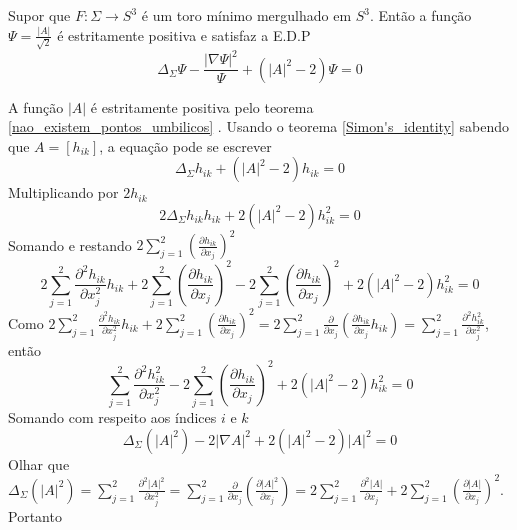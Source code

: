 \begin{proposicao}\label{edp_principal}
	Supor que $F: \Sigma \rightarrow S^3$ é um toro mínimo mergulhado em $S^3$. Então a função $\Psi = \frac{|A|}{\sqrt{2}}$ é estritamente positiva e satisfaz a E.D.P
	\begin{equation*}
		\Delta_\Sigma \Psi - \frac{|\nabla \Psi|^2}{\Psi} + (|A|^2 - 2) \Psi = 0
	\end{equation*}
\end{proposicao}

\begin{demonstracao}
	A função $|A|$ é estritamente positiva pelo teorema \ref{nao_existem_pontos_umbilicos} . Usando o  teorema \ref{Simon's_identity} sabendo que $A = [h_{ik}]$, a equação pode se escrever
	\begin{equation*}
		\Delta_{\Sigma} h_{ik} + (|A|^2 - 2)h_{ik} = 0
	\end{equation*}	
	Multiplicando por $2 h_{ik}$
	\begin{equation*}
		2 \Delta_{\Sigma} h_{ik} h_{ik} + 2 (|A|^2 - 2)h_{ik}^2 = 0
	\end{equation*}	
	Somando e restando $ 2 \sum_{j=1}^2 \left( \frac{\partial h_{ik}}{\partial x_j} \right)^2 $
	\begin{equation*}
		2 \sum_{j=1}^2 \frac{\partial^2 h_{ik}}{\partial x_j^2} h_{ik} + 2 \sum_{j=1}^2 \left( \frac{\partial h_{ik}}{\partial x_j} \right)^2 - 2 \sum_{j=1}^2 \left( \frac{\partial h_{ik}}{\partial x_j} \right)^2 + 2 (|A|^2 - 2)h_{ik}^2 = 0
	\end{equation*}	
	Como $ 2 \sum_{j=1}^2 \frac{\partial^2 h_{ik}}{\partial x_j^2} h_{ik} + 2 \sum_{j=1}^2 \left( \frac{\partial h_{ik}}{\partial x_j} \right)^2 = 2 \sum_{j=1}^2 \frac{\partial }{\partial x_j} \left( \frac{\partial h_{ik}}{\partial x_j} h_{ik} \right) = \sum_{j=1}^2 \frac{\partial^2 h_{ik}^2}{\partial x_j^2} $, então
	\begin{equation*}
		\sum_{j=1}^2 \frac{\partial^2 h_{ik}^2}{\partial x_j^2} - 2 \sum_{j=1}^2 \left( \frac{\partial h_{ik}}{\partial x_j} \right)^2 + 2 (|A|^2 - 2)h_{ik}^2 = 0
	\end{equation*}	
	Somando com respeito aos índices $i$ e $k$
	\begin{equation*}
	\Delta_{\Sigma} (|A|^2) - 2 | \nabla A |^2 + 2 (|A|^2 - 2) |A|^2 = 0
	\end{equation*}	
	Olhar que $ \Delta_{\Sigma} (|A|^2) = \sum_{j=1}^2 \frac{\partial^2 |A|^2}{\partial x_j^2} = \sum_{j=1}^2 \frac{\partial}{\partial x_j} \left( \frac{\partial |A|^2}{\partial x_j} \right) = 2 \sum_{j=1}^2 \frac{\partial^2 |A|}{\partial x_j} + 2 \sum_{j=1}^2 \left( \frac{\partial |A|}{\partial x_j} \right)^2 $. Portanto

\end{demonstracao}
